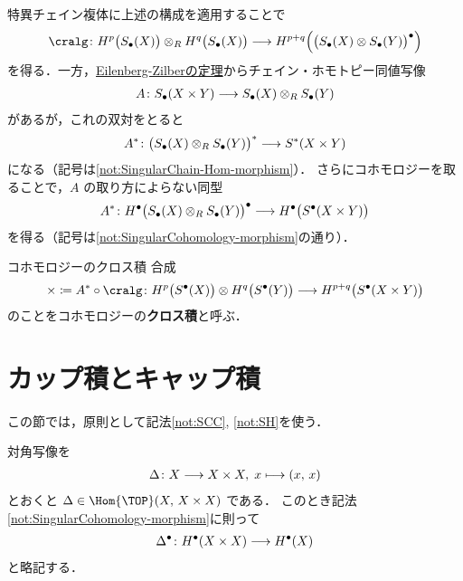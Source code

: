 \documentclass[algtopo_main]{subfiles}
\begin{document}
特異チェイン複体に上述の構成を適用することで
\begin{align}
    \cralg \colon H^p \bigl( S_\bullet (X) \bigr) \otimes_R H^q \bigl( S_\bullet (X) \bigr) \lto H^{p+q} \Bigl( \bigl(S_\bullet (X) \otimes S_\bullet(Y) \bigr)^\bullet \Bigr) 
\end{align}
を得る．一方，\hyperref[thm:EZ]{Eilenberg-Zilberの定理}からチェイン・ホモトピー同値写像
\begin{align}
    A \colon S_\bullet (X \times Y) \longrightarrow S_\bullet(X) \otimes_R S_\bullet (Y)
\end{align}
があるが，これの双対をとると
\begin{align}
    A^* \colon \bigl(  S_\bullet(X) \otimes_R S_\bullet (Y) \bigr)^* \longrightarrow S^* (X \times Y)
\end{align}
になる（記号は\eqref{not:SingularChain-Hom-morphism}）．
さらにコホモロジーを取ることで，$A$ の取り方によらない同型
\begin{align}
    A^*\colon H^\bullet \bigl( S_\bullet (X) \otimes_R S_\bullet (Y) \bigr)^\bullet \longrightarrow H^\bullet \bigl( S^\bullet (X \times Y) \bigr) 
\end{align}
を得る（記号は\eqref{not:SingularCohomology-morphism}の通り）．

\begin{mydef}[label=def:cohomology-cross]{コホモロジーのクロス積}
    合成
    \begin{align}
        \times \coloneqq A^* \circ \cralg \colon H^p \bigl( S^\bullet (X) \bigr) \otimes H^q \bigl( S^\bullet (Y) \bigr) \lto H^{p+q} \bigl( S^\bullet(X \times Y) \bigr) 
    \end{align}
    のことをコホモロジーの\textbf{クロス積}と呼ぶ．
\end{mydef}

\section{カップ積とキャップ積}


この節では，原則として記法\eqref{not:SCC}, \eqref{not:SH}を使う．

対角写像を
\begin{align}
    \Delta \colon X \longrightarrow X \times X,\; x \longmapsto (x,\, x)
\end{align}
とおくと $\Delta \in \Hom{\TOP} (X,\, X\times X)$ である．
このとき記法\eqref{not:SingularCohomology-morphism}に則って
\begin{align}
    \Delta^\bullet \colon H^\bullet (X \times X) \longrightarrow H^\bullet (X)
\end{align}
と略記する．
\end{document}

